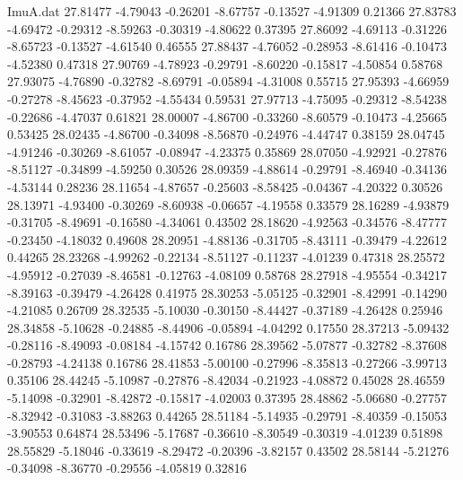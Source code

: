 \begin{filecontents}{ImuA.dat}
  27.81477   -4.79043   -0.26201   -8.67757   -0.13527   -4.91309    0.21366
  27.83783   -4.69472   -0.29312   -8.59263   -0.30319   -4.80622    0.37395
  27.86092   -4.69113   -0.31226   -8.65723   -0.13527   -4.61540    0.46555
  27.88437   -4.76052   -0.28953   -8.61416   -0.10473   -4.52380    0.47318
  27.90769   -4.78923   -0.29791   -8.60220   -0.15817   -4.50854    0.58768
  27.93075   -4.76890   -0.32782   -8.69791   -0.05894   -4.31008    0.55715
  27.95393   -4.66959   -0.27278   -8.45623   -0.37952   -4.55434    0.59531
  27.97713   -4.75095   -0.29312   -8.54238   -0.22686   -4.47037    0.61821
  28.00007   -4.86700   -0.33260   -8.60579   -0.10473   -4.25665    0.53425
  28.02435   -4.86700   -0.34098   -8.56870   -0.24976   -4.44747    0.38159
  28.04745   -4.91246   -0.30269   -8.61057   -0.08947   -4.23375    0.35869
  28.07050   -4.92921   -0.27876   -8.51127   -0.34899   -4.59250    0.30526
  28.09359   -4.88614   -0.29791   -8.46940   -0.34136   -4.53144    0.28236
  28.11654   -4.87657   -0.25603   -8.58425   -0.04367   -4.20322    0.30526
  28.13971   -4.93400   -0.30269   -8.60938   -0.06657   -4.19558    0.33579
  28.16289   -4.93879   -0.31705   -8.49691   -0.16580   -4.34061    0.43502
  28.18620   -4.92563   -0.34576   -8.47777   -0.23450   -4.18032    0.49608
  28.20951   -4.88136   -0.31705   -8.43111   -0.39479   -4.22612    0.44265
  28.23268   -4.99262   -0.22134   -8.51127   -0.11237   -4.01239    0.47318
  28.25572   -4.95912   -0.27039   -8.46581   -0.12763   -4.08109    0.58768
  28.27918   -4.95554   -0.34217   -8.39163   -0.39479   -4.26428    0.41975
  28.30253   -5.05125   -0.32901   -8.42991   -0.14290   -4.21085    0.26709
  28.32535   -5.10030   -0.30150   -8.44427   -0.37189   -4.26428    0.25946
  28.34858   -5.10628   -0.24885   -8.44906   -0.05894   -4.04292    0.17550
  28.37213   -5.09432   -0.28116   -8.49093   -0.08184   -4.15742    0.16786
  28.39562   -5.07877   -0.32782   -8.37608   -0.28793   -4.24138    0.16786
  28.41853   -5.00100   -0.27996   -8.35813   -0.27266   -3.99713    0.35106
  28.44245   -5.10987   -0.27876   -8.42034   -0.21923   -4.08872    0.45028
  28.46559   -5.14098   -0.32901   -8.42872   -0.15817   -4.02003    0.37395
  28.48862   -5.06680   -0.27757   -8.32942   -0.31083   -3.88263    0.44265
  28.51184   -5.14935   -0.29791   -8.40359   -0.15053   -3.90553    0.64874
  28.53496   -5.17687   -0.36610   -8.30549   -0.30319   -4.01239    0.51898
  28.55829   -5.18046   -0.33619   -8.29472   -0.20396   -3.82157    0.43502
  28.58144   -5.21276   -0.34098   -8.36770   -0.29556   -4.05819    0.32816

\end{filecontents}
